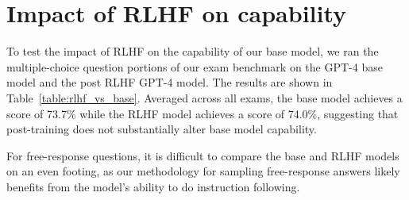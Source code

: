 \documentclass{article}
\begin{document}
\section{Impact of RLHF on capability}

To test the impact of RLHF on the capability of our base model, we ran the multiple-choice question portions of our exam benchmark on the GPT-4 base model and the post RLHF GPT-4 model. The results are shown in Table~\ref{table:rlhf_vs_base}. Averaged across all exams, the base model achieves a score of 73.7\% while the RLHF model achieves a score of 74.0\%, suggesting that post-training does not substantially alter base model capability.

For free-response questions, it is difficult to compare the base and RLHF models on an even footing, as our methodology for sampling free-response answers likely benefits from the model's ability to do instruction following.
\end{document}
